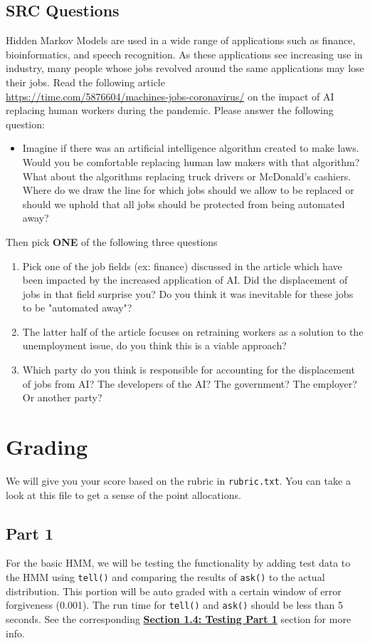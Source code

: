 \documentclass{article}
\begin{document}
\subsection{SRC Questions}
Hidden Markov Models are used in a wide range of applications such as finance, bioinformatics, and speech recognition. As these applications see increasing use in industry, many people whose jobs revolved around the same applications may lose their jobs. Read the following article \\\url{https://time.com/5876604/machines-jobs-coronavirus/}
on the impact of AI replacing human workers during the pandemic. Please answer the following question:
\begin{itemize}
     \item Imagine if there was an artificial intelligence algorithm created to make laws. Would you be comfortable replacing human law makers with that algorithm? What about the algorithms replacing truck drivers or McDonald's cashiers. Where do we draw the line for which jobs should we allow to be replaced or should we uphold that all jobs should be protected from being automated away?
\end{itemize}
Then pick \textbf{ONE} of the following three questions
\begin{enumerate}
    \item Pick one of the job fields (ex: finance) discussed in the article which have been impacted by the increased application of AI. Did the displacement of jobs in that field surprise you? Do you think it was inevitable for these jobs to be "automated away"?
    \item The latter half of the article focuses on retraining workers as a solution to the unemployment issue, do you think this is a viable approach?
    \item Which party do you think is responsible for accounting for the displacement of jobs from AI? The developers of the AI? The government? The employer? Or another party?
\end{enumerate}

\section{Grading}
We will give you your score based on the rubric in \texttt{rubric.txt}. You can take a look at this file to get a sense of the point allocations.

\subsection{Part 1}
For the basic HMM, we will be testing the functionality by adding test data to the HMM using \texttt{tell()} and comparing the results of \texttt{ask()} to the actual distribution. This portion will be auto graded with a certain window of error forgiveness (0.001). The run time for \texttt{tell()} and \texttt{ask()} should be less than 5 seconds. See the corresponding \hyperref[subsec:testingpart1]{\textbf{Section 1.4: Testing Part 1}} section for more info.
\end{document}
